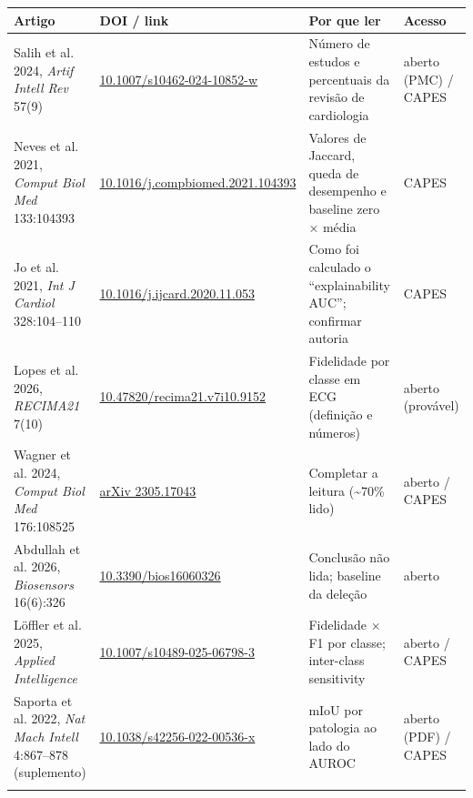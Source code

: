\documentclass[11pt,a4paper]{article}
\begin{document}
{\scriptsize\setlength{\tabcolsep}{3pt}
\begin{xltabular}{\linewidth}{>{\raggedright\arraybackslash}X>{\raggedright\arraybackslash}X>{\raggedright\arraybackslash}X>{\raggedright\arraybackslash}X}
\toprule
\textbf{Artigo} & \textbf{DOI / link} & \textbf{Por que ler} & \textbf{Acesso} \\
\midrule
\endhead
Salih et al. 2024, \textit{Artif Intell Rev} 57(9) & \href{https://link.springer.com/article/10.1007/s10462-024-10852-w}{10.1007/s10462-024-10852-w} & Número de estudos e percentuais da revisão de cardiologia & aberto (PMC) / CAPES \\ \addlinespace[1pt]
Neves et al. 2021, \textit{Comput Biol Med} 133:104393 & \href{https://boa.unimib.it/handle/10281/324847}{10.1016/j.compbiomed.2021.104393} & Valores de Jaccard, queda de desempenho e baseline zero × média & CAPES \\ \addlinespace[1pt]
Jo et al. 2021, \textit{Int J Cardiol} 328:104–110 & \href{https://www.aminer.org/pub/5fcb5b25d4150a363cc9762f/explainable-artificial-intelligence-to-detect-atrial-fibrillation-using-electrocardiogram}{10.1016/j.ijcard.2020.11.053} & Como foi calculado o ``explainability AUC''; confirmar autoria & CAPES \\ \addlinespace[1pt]
Lopes et al. 2026, \textit{RECIMA21} 7(10) & \href{https://recima21.com.br/recima21/en/article/view/9152}{10.47820/recima21.v7i10.9152} & Fidelidade por classe em ECG (definição e números) & aberto (provável) \\ \addlinespace[1pt]
Wagner et al. 2024, \textit{Comput Biol Med} 176:108525 & \href{https://arxiv.org/html/2305.17043v2}{arXiv 2305.17043} & Completar a leitura (\textasciitilde{}70\% lido) & aberto / CAPES \\ \addlinespace[1pt]
Abdullah et al. 2026, \textit{Biosensors} 16(6):326 & \href{https://pmc.ncbi.nlm.nih.gov/articles/PMC13296925/}{10.3390/bios16060326} & Conclusão não lida; baseline da deleção & aberto \\ \addlinespace[1pt]
Löffler et al. 2025, \textit{Applied Intelligence} & \href{https://arxiv.org/abs/2203.07861}{10.1007/s10489-025-06798-3} & Fidelidade × F1 por classe; inter-class sensitivity & aberto / CAPES \\ \addlinespace[1pt]
Saporta et al. 2022, \textit{Nat Mach Intell} 4:867–878 (suplemento) & \href{https://asaporta.github.io/assets/pdf/chexlocalize.pdf}{10.1038/s42256-022-00536-x} & mIoU por patologia ao lado do AUROC & aberto (PDF) / CAPES \\ \addlinespace[1pt]

\end{xltabular}}
\end{document}

